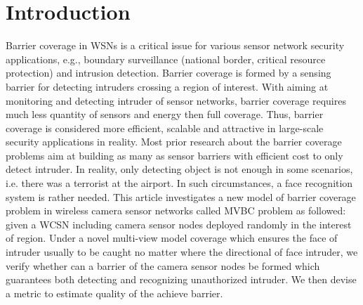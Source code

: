 \documentclass[3p]{elsarticle}
\begin{document}
\section{Introduction}
\label{sec:intro}
Barrier coverage in WSNs is a critical issue for various sensor network security applications, e.g., boundary surveillance (national border, critical resource protection) and intrusion detection. Barrier coverage is formed by a sensing barrier for detecting intruders crossing a region of interest. With aiming at monitoring and detecting intruder of sensor networks, barrier coverage requires much less quantity of sensors and energy then full coverage. Thus, barrier coverage is considered more efficient, scalable and attractive in large-scale security applications in reality. Most prior research about the barrier coverage problems aim at building as many as sensor barriers with efficient cost to only detect intruder. In reality, only detecting object is not enough in some scenarios, i.e. there was a terrorist at the airport. In such circumstances, a face recognition system is rather needed. This article investigates a new model of barrier coverage problem in wireless camera sensor networks called MVBC problem as followed: given a WCSN including camera sensor nodes deployed randomly in the interest of region. Under a novel multi-view model coverage which ensures the face of intruder usually to be caught no matter where the directional of face intruder, we verify whether can a barrier of the camera sensor nodes be formed which guarantees both detecting and recognizing unauthorized intruder. We then devise a metric to estimate quality of the achieve barrier. \par
\end{document}
